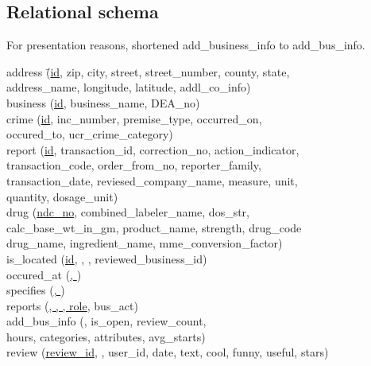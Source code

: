 \subsection*{Relational schema}
For presentation reasons, shortened add\_business\_info to add\_bus\_info.
\begin{center}
    \begin{tabbing}
        address \qquad\qquad\= (\uline{id}, zip, city, street, street\_number, county, state,\\
        \hspace{26mm} address\_name, longitude, latitude, addl\_co\_info)\\
        business \> (\uline{id}, business\_name, DEA\_no)\\
        crime \> (\uline{id}, inc\_number, premise\_type, occurred\_on,\\
        \hspace{26mm} occured\_to, ucr\_crime\_category)\\
        report \> (\uline{id}, transaction\_id, correction\_no, action\_indicator,\\
        \hspace{26mm} transaction\_code, order\_from\_no, reporter\_family,\\
        \hspace{26mm} transaction\_date, reviesed\_company\_name, measure, unit,\\
        \hspace{26mm}  quantity, dosage\_unit)\\
        drug \> (\uline{ndc\_no}, combined\_labeler\_name, dos\_str, \\
        \hspace{26mm} calc\_base\_wt\_in\_gm, product\_name, strength, drug\_code \\
        \hspace{26mm} drug\_name, ingredient\_name, mme\_conversion\_factor)\\
        is\_located \> (\uline{id}, , , reviewed\_business\_id)\\
        occured\_at \> (\uline{, })\\
        specifies \> (\uline{, })\\
        reports \> (\uline{, , , role}, bus\_act)\\
        add\_bus\_info \> (\uline{}, is\_open, review\_count,\\ 
        \hspace{26mm} hours, categories, attributes, avg\_starts)\\
        review \> (\uline{review\_id}, , user\_id, date, text, cool, funny, useful, stars)\\
    \end{tabbing}    
\end{center}


